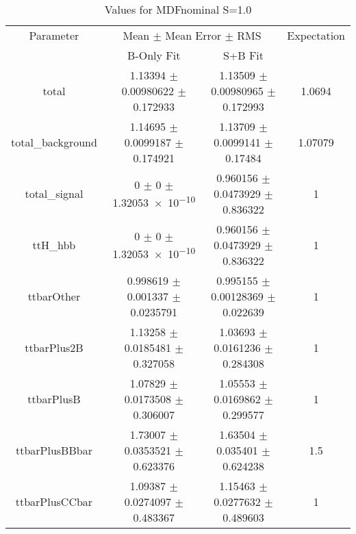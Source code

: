 \begin{table}
\centering
\caption{Values for MDFnominal S=1.0}
\begin{tabular}{cccc}
\toprule
Parameter & \multicolumn{2}{c}{Mean $\pm$ Mean Error $\pm$ RMS} & Expectation\\
 & B-Only Fit & S+B Fit & \\
\midrule
total & \num{1.13394} $\pm$ \num{0.00980622} $\pm$ \num{0.172933} & \num{1.13509} $\pm$ \num{0.00980965} $\pm$ \num{0.172993} & \num{1.0694}\\
total\_background & \num{1.14695} $\pm$ \num{0.0099187} $\pm$ \num{0.174921} & \num{1.13709} $\pm$ \num{0.0099141} $\pm$ \num{0.17484} & \num{1.07079}\\
total\_signal & \num{0} $\pm$ \num{0} $\pm$ \num{1.32053e-10} & \num{0.960156} $\pm$ \num{0.0473929} $\pm$ \num{0.836322} & \num{1}\\
ttH\_hbb & \num{0} $\pm$ \num{0} $\pm$ \num{1.32053e-10} & \num{0.960156} $\pm$ \num{0.0473929} $\pm$ \num{0.836322} & \num{1}\\
ttbarOther & \num{0.998619} $\pm$ \num{0.001337} $\pm$ \num{0.0235791} & \num{0.995155} $\pm$ \num{0.00128369} $\pm$ \num{0.022639} & \num{1}\\
ttbarPlus2B & \num{1.13258} $\pm$ \num{0.0185481} $\pm$ \num{0.327058} & \num{1.03693} $\pm$ \num{0.0161236} $\pm$ \num{0.284308} & \num{1}\\
ttbarPlusB & \num{1.07829} $\pm$ \num{0.0173508} $\pm$ \num{0.306007} & \num{1.05553} $\pm$ \num{0.0169862} $\pm$ \num{0.299577} & \num{1}\\
ttbarPlusBBbar & \num{1.73007} $\pm$ \num{0.0353521} $\pm$ \num{0.623376} & \num{1.63504} $\pm$ \num{0.035401} $\pm$ \num{0.624238} & \num{1.5}\\
ttbarPlusCCbar & \num{1.09387} $\pm$ \num{0.0274097} $\pm$ \num{0.483367} & \num{1.15463} $\pm$ \num{0.0277632} $\pm$ \num{0.489603} & \num{1}\\
\bottomrule
\end{tabular}
\end{table}